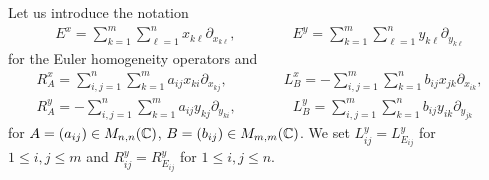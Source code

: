 Let us introduce the notation
\begin{align}
  E^x= \sum_{k=1}^m \sum_{\ell=1}^n x_{k\ell} \partial_{x_{k\ell}}, \qquad \qquad E^y= \sum_{k=1}^m \sum_{\ell=1}^n y_{k\ell} \partial_{y_{k\ell}}
\end{align}
for the Euler homogeneity operators and
\begin{gather}
  R^x_A=  \sum_{i,j = 1}^n \sum_{k=1}^m a_{ij} x_{ki} \partial_{x_{kj}}, \qquad \qquad L^x_B= - \sum_{i,j=1}^m \sum_{k=1}^n b_{ij} x_{jk} \partial_{x_{ik}}, \label{eq:left right action x AGS} \\
  R^y_A= - \sum_{i,j=1}^n \sum_{k=1}^m a_{ij}y_{kj} \partial_{y_{ki}}, \qquad \qquad L^y_B= \sum_{i,j=1}^m \sum_{k=1}^n b_{ij}y_{ik} \partial_{y_{jk}}  \label{eq:left right action y AGS}
\end{gather}
for $A=(a_{ij}) \in M_{n,n}(\mathbb{C})$, $B=(b_{ij}) \in M_{m,m}(\mathbb{C})$. We set $L^y_{ij}=L^y_{E_{ij}}$ for $1 \leq i,j \leq m$ and $R^y_{ij}=R^y_{E_{ij}}$ for $1 \leq i,j \leq n$.
\medskip


